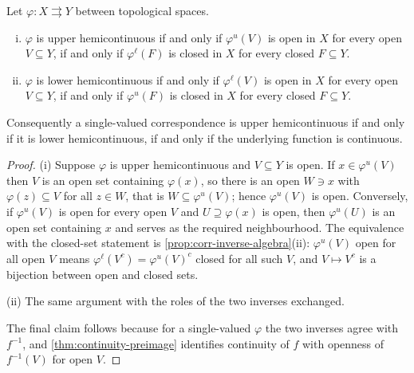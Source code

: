 \begin{proposition}\label{prop:hemicontinuity-global}
	Let $\varphi\colon X\rightrightarrows Y$ between topological spaces.
	\begin{enumerate}[(i)]
		\item $\varphi$ is upper hemicontinuous if and only if $\varphi^{u}(V)$ is open
		      in $X$ for every open $V\subseteq Y$, if and only if $\varphi^{\ell}(F)$ is
		      closed in $X$ for every closed $F\subseteq Y$.
		\item $\varphi$ is lower hemicontinuous if and only if $\varphi^{\ell}(V)$ is
		      open in $X$ for every open $V\subseteq Y$, if and only if $\varphi^{u}(F)$
		      is closed in $X$ for every closed $F\subseteq Y$.
	\end{enumerate}
	Consequently a single-valued correspondence is upper hemicontinuous if and only
	if it is lower hemicontinuous, if and only if the underlying function is
	continuous.
\end{proposition}

\begin{proof}
	(i) Suppose $\varphi$ is upper hemicontinuous and $V\subseteq Y$ is open. If
	$x\in\varphi^{u}(V)$ then $V$ is an open set containing $\varphi(x)$, so there
	is an open $W\ni x$ with $\varphi(z)\subseteq V$ for all $z\in W$, that is
	$W\subseteq\varphi^{u}(V)$; hence $\varphi^{u}(V)$ is open. Conversely, if
	$\varphi^{u}(V)$ is open for every open $V$ and $U\supseteq\varphi(x)$ is open,
	then $\varphi^{u}(U)$ is an open set containing $x$ and serves as the required
	neighbourhood. The equivalence with the closed-set statement is
	\autoref{prop:corr-inverse-algebra}(ii): $\varphi^{u}(V)$ open for all open $V$
	means $\varphi^{\ell}(V^{c})=\varphi^{u}(V)^{c}$ closed for all such $V$, and
	$V\mapsto V^{c}$ is a bijection between open and closed sets.

	(ii) The same argument with the roles of the two inverses exchanged.

	The final claim follows because for a single-valued $\varphi$ the two inverses
	agree with $f^{-1}$, and \autoref{thm:continuity-preimage} identifies continuity
	of $f$ with openness of $f^{-1}(V)$ for open $V$.
\end{proof}

